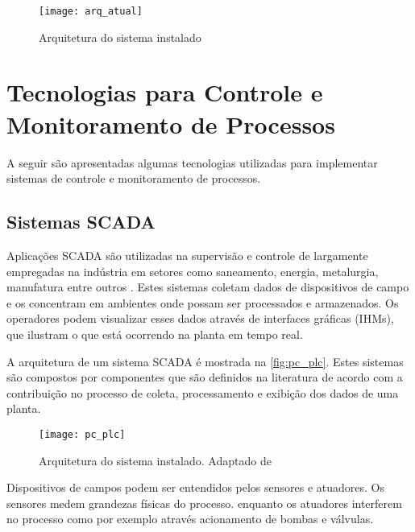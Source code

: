 			\begin{figure}[!htb]	
				\captionsetup{justification=centering}
				\begin{center}
					\texttt{[image: arq\_atual]}  %
					\caption[Arquitetura do sistema instalado]{\label{fig:arq_atual}Arquitetura do sistema instalado}
				\end{center}		
			\end{figure}
		
	
	\section{Tecnologias para Controle e Monitoramento de Processos}
		\label{sec:rev_monitor}
		A seguir são apresentadas algumas tecnologias utilizadas para implementar sistemas de controle e monitoramento de processos.
		
		\subsection{Sistemas SCADA}
		Aplicações SCADA são utilizadas na supervisão e controle de largamente empregadas na indústria em setores como saneamento, energia, metalurgia, manufatura entre outros \cite{pablo2011}. Estes sistemas coletam dados de dispositivos de campo e os concentram em ambientes onde possam ser processados e armazenados. Os operadores podem visualizar esses dados através de interfaces gráficas (IHMs), que ilustram o que está ocorrendo na planta em tempo real. 
		
		A arquitetura de um sistema SCADA é mostrada na \autoref{fig:pc_plc}. Estes sistemas são compostos por componentes que são definidos na literatura de acordo com a contribuição no processo de coleta, processamento e exibição dos dados de uma planta.
		
		\begin{figure}[!htb]	
			\captionsetup{justification=centering}
			\begin{center}
				\texttt{[image: pc\_plc]}  %
				\caption[Arquitetura do sistema instalado]{\label{fig:pc_plc}Arquitetura do sistema instalado. Adaptado de \textcite{pablo2011}}
			\end{center}		
		\end{figure}
	
		Dispositivos de campos podem ser entendidos pelos sensores e atuadores. Os sensores medem grandezas físicas do processo. enquanto os atuadores interferem no processo como por exemplo através  acionamento de bombas e válvulas. 
	
